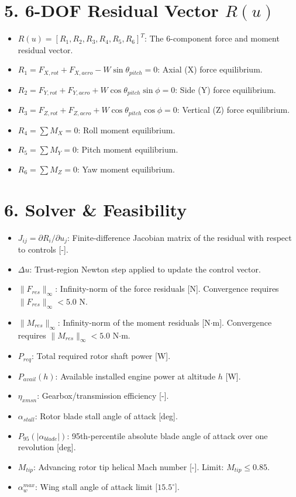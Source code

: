 \documentclass{article}
\begin{document}
\section*{5. 6-DOF Residual Vector $R(u)$}
\begin{itemize}
    \item $R(u) = [R_1, R_2, R_3, R_4, R_5, R_6]^T$: The 6-component force and moment residual vector.
    \item $R_1 = F_{X,rot} + F_{X,aero} - W\sin\theta_{pitch} = 0$: Axial (X) force equilibrium.
    \item $R_2 = F_{Y,rot} + F_{Y,aero} + W\cos\theta_{pitch}\sin\phi = 0$: Side (Y) force equilibrium.
    \item $R_3 = F_{Z,rot} + F_{Z,aero} + W\cos\theta_{pitch}\cos\phi = 0$: Vertical (Z) force equilibrium.
    \item $R_4 = \sum M_X = 0$: Roll moment equilibrium.
    \item $R_5 = \sum M_Y = 0$: Pitch moment equilibrium.
    \item $R_6 = \sum M_Z = 0$: Yaw moment equilibrium.
\end{itemize}

\section*{6. Solver \& Feasibility}
\begin{itemize}
    \item $J_{ij} = \partial R_i / \partial u_j$: Finite-difference Jacobian matrix of the residual with respect to controls [-].
    \item $\Delta u$: Trust-region Newton step applied to update the control vector.
    \item $\|F_{res}\|_\infty$: Infinity-norm of the force residuals [N]. Convergence requires $\|F_{res}\|_\infty < 5.0$ N.
    \item $\|M_{res}\|_\infty$: Infinity-norm of the moment residuals [N$\cdot$m]. Convergence requires $\|M_{res}\|_\infty < 5.0$ N$\cdot$m.
    \item $P_{req}$: Total required rotor shaft power [W].
    \item $P_{avail}(h)$: Available installed engine power at altitude $h$ [W].
    \item $\eta_{xmsn}$: Gearbox/transmission efficiency [-].
    \item $\alpha_{stall}$: Rotor blade stall angle of attack [deg].
    \item $P_{95}(|\alpha_{blade}|)$: 95th-percentile absolute blade angle of attack over one revolution [deg].
    \item $M_{tip}$: Advancing rotor tip helical Mach number [-]. Limit: $M_{tip} \leq 0.85$.
    \item $\alpha_w^{max}$: Wing stall angle of attack limit [$15.5^\circ$].
\end{itemize}
\end{document}
